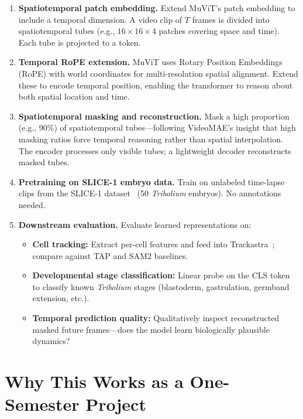 \documentclass{article}
\begin{document}
\begin{enumerate}
	\item \textbf{Spatiotemporal patch embedding.} Extend MuViT's patch embedding to include a temporal dimension. A video clip of $T$ frames is divided into spatiotemporal tubes (e.g., $16 \times 16 \times 4$ patches covering space and time). Each tube is projected to a token.
	\item \textbf{Temporal RoPE extension.} MuViT uses Rotary Position Embeddings (RoPE) with world coordinates for multi-resolution spatial alignment. Extend these to encode temporal position, enabling the transformer to reason about both spatial location and time.
	\item \textbf{Spatiotemporal masking and reconstruction.} Mask a high proportion (e.g., 90\%) of spatiotemporal tubes---following VideoMAE's insight that high masking ratios force temporal reasoning rather than spatial interpolation. The encoder processes only visible tubes; a lightweight decoder reconstructs masked tubes.
	\item \textbf{Pretraining on SLICE-1 embryo data.} Train on unlabeled time-lapse clips from the SLICE-1 dataset~\cite{slice1} (50 \textit{Tribolium} embryos). No annotations needed.
	\item \textbf{Downstream evaluation.} Evaluate learned representations on:
	      \begin{itemize}
		      \item \textbf{Cell tracking:} Extract per-cell features and feed into Trackastra~\cite{trackastra}; compare against TAP and SAM2 baselines.
		      \item \textbf{Developmental stage classification:} Linear probe on the CLS token to classify known \textit{Tribolium} stages (blastoderm, gastrulation, germband extension, etc.).
		      \item \textbf{Temporal prediction quality:} Qualitatively inspect reconstructed masked future frames---does the model learn biologically plausible dynamics?
	      \end{itemize}
\end{enumerate}

\section*{Why This Works as a One-Semester Project}
\end{document}
